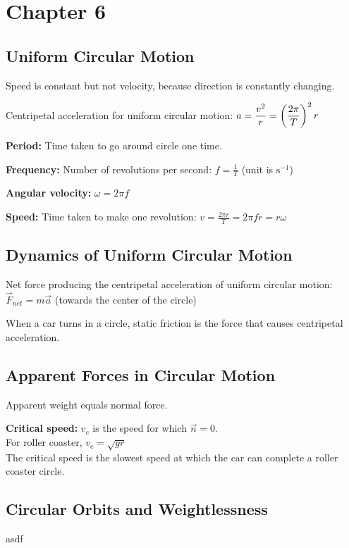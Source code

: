 \section{Chapter 6}

\subsection{Uniform Circular Motion}

Speed is constant but not velocity, because direction is constantly changing.

Centripetal acceleration for uniform circular motion: $\displaystyle a = \frac{v^2}{r} = \left(\frac{2\pi}{T}\right)^2 r$

\textbf{Period:} Time taken to go around circle one time.

\textbf{Frequency:} Number of revolutions per second: $\displaystyle f = \frac{1}{T}$ (unit is $\mathrm{s}^{-1}$)

\textbf{Angular velocity:} $\omega = 2\pi f$

\textbf{Speed:} Time taken to make one revolution: $\displaystyle v = \frac{2\pi r}{T} = 2\pi fr = r\omega$

\subsection{Dynamics of Uniform Circular Motion}

Net force producing the centripetal acceleration of uniform circular motion: $\Vec{F}_{net} = m\Vec{a}$ (towards the center of the circle)

When a car turns in a circle, static friction is the force that causes centripetal acceleration.

\subsection{Apparent Forces in Circular Motion}

Apparent weight equals normal force.

\textbf{Critical speed:} $v_c$ is the speed for which $\Vec{n} = 0$.\\
For roller coaster, $v_c = \sqrt{gr}$\\
The critical speed is the slowest speed at which the car can complete a roller coaster circle.

\subsection{Circular Orbits and Weightlessness}

asdf
